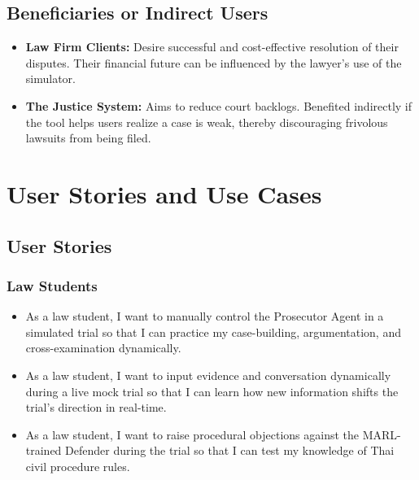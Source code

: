 \subsection{Beneficiaries or Indirect Users}
\begin{itemize}
    \item \textbf{Law Firm Clients:} Desire successful and cost-effective resolution of their disputes. Their financial future can be influenced by the lawyer's use of the simulator.
    \item \textbf{The Justice System:} Aims to reduce court backlogs. Benefited indirectly if the tool helps users realize a case is weak, thereby discouraging frivolous lawsuits from being filed.
\end{itemize}


\section{User Stories and Use Cases}
\label{section:user-stories-use-cases}

\subsection{User Stories}

\subsubsection{Law Students}
\begin{itemize}
    \item As a law student, I want to manually control the Prosecutor Agent in a simulated trial so that I can practice my case-building, argumentation, and cross-examination dynamically.
    \item As a law student, I want to input evidence and conversation dynamically during a live mock trial so that I can learn how new information shifts the trial's direction in real-time.
    \item As a law student, I want to raise procedural objections against the MARL-trained Defender during the trial so that I can test my knowledge of Thai civil procedure rules.
\end{itemize}

